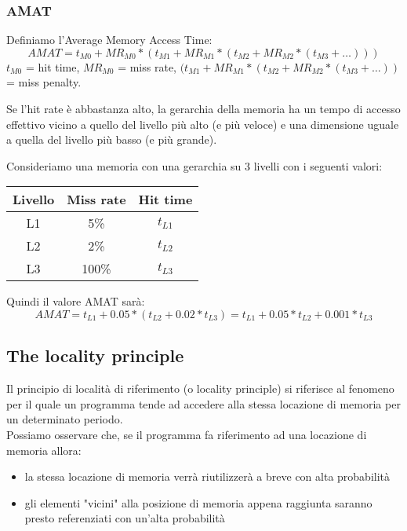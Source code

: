 \subsubsection{AMAT}
Definiamo l'Average Memory Access Time:
\begin{equation}
    AMAT = t_{M0} + MR_{M0} * (t_{M1} + MR_{M1} * (t_{M2} + MR_{M2} * (t_{M3} + \ldots)))
\end{equation}
$t_{M0}$ = hit time, $MR_{M0}$ = miss rate, $(t_{M1} + MR_{M1} * (t_{M2} + MR_{M2} * (t_{M3} + \ldots))$ = miss penalty.

\begin{observation}
Se l'hit rate è abbastanza alto, la gerarchia della memoria ha un tempo di accesso effettivo vicino a quello del livello più alto (e più veloce) e una dimensione uguale a quella del livello più basso (e più grande).
\end{observation}

\begin{example}
	Consideriamo una memoria con una gerarchia su 3 livelli con i seguenti valori:
	\begin{center}
		\begin{tabular}{|c|c|c|}
			\hline
			\textbf{Livello} & \textbf{Miss rate} & \textbf{Hit time} \\
			\hline
			L1 & 5\% & $t_{L1}$ \\
			L2 & 2\% & $t_{L2}$ \\
			L3 & 100\% & $t_{L3}$ \\
			\hline
		\end{tabular}
	\end{center}
	Quindi il valore AMAT sarà:
	\begin{equation*}
		AMAT= t_{L1} + 0.05 * (t_{L2} + 0.02 * t_{L3}) = t_{L1} + 0.05 * t_{L2} + 0.001 * t_{L3}
	\end{equation*}
\end{example}

\subsection{The locality principle}
Il principio di località di riferimento (o locality principle) si riferisce al fenomeno per il quale un programma tende ad accedere alla stessa locazione di memoria per un determinato periodo.\\
Possiamo osservare che, se il programma fa riferimento ad una locazione di memoria allora:
\begin{itemize}
	\item la stessa locazione di memoria verrà riutilizzerà a breve con alta probabilità
	\item gli elementi "vicini" alla posizione di memoria appena raggiunta saranno presto referenziati con un'alta probabilità
\end{itemize}

